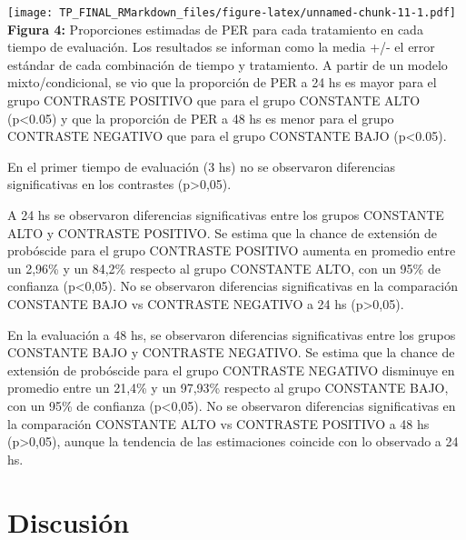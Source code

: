 \documentclass[]{article}
\begin{document}
\texttt{[image: TP\_FINAL\_RMarkdown\_files/figure-latex/unnamed-chunk-11-1.pdf]}
\textbf{Figura 4:} Proporciones estimadas de PER para cada tratamiento
en cada tiempo de evaluación. Los resultados se informan como la media
+/- el error estándar de cada combinación de tiempo y tratamiento. A
partir de un modelo mixto/condicional, se vio que la proporción de PER a
24 hs es mayor para el grupo CONTRASTE POSITIVO que para el grupo
CONSTANTE ALTO (p\textless{}0.05) y que la proporción de PER a 48 hs es
menor para el grupo CONTRASTE NEGATIVO que para el grupo CONSTANTE BAJO
(p\textless{}0.05).

En el primer tiempo de evaluación (3 hs) no se observaron diferencias
significativas en los contrastes (p\textgreater{}0,05).

A 24 hs se observaron diferencias significativas entre los grupos
CONSTANTE ALTO y CONTRASTE POSITIVO. Se estima que la chance de
extensión de probóscide para el grupo CONTRASTE POSITIVO aumenta en
promedio entre un 2,96\% y un 84,2\% respecto al grupo CONSTANTE ALTO,
con un 95\% de confianza (p\textless{}0,05). No se observaron
diferencias significativas en la comparación CONSTANTE BAJO vs CONTRASTE
NEGATIVO a 24 hs (p\textgreater{}0,05).

En la evaluación a 48 hs, se observaron diferencias significativas entre
los grupos CONSTANTE BAJO y CONTRASTE NEGATIVO. Se estima que la chance
de extensión de probóscide para el grupo CONTRASTE NEGATIVO disminuye en
promedio entre un 21,4\% y un 97,93\% respecto al grupo CONSTANTE BAJO,
con un 95\% de confianza (p\textless{}0,05). No se observaron
diferencias significativas en la comparación CONSTANTE ALTO vs CONTRASTE
POSITIVO a 48 hs (p\textgreater{}0,05), aunque la tendencia de las
estimaciones coincide con lo observado a 24 hs.

\hypertarget{discusiuxf3n}{%
\section{Discusión}\label{discusiuxf3n}}
\end{document}
